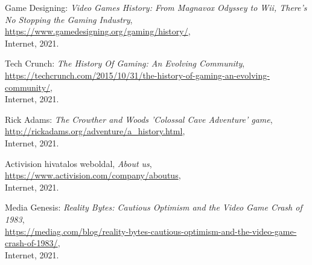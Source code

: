 \begin{thebibliography}{x}
	Game Designing: \emph{Video Games History: From Magnavox Odyssey to Wii, There’s No Stopping the Gaming Industry}, \\
	\url{https://www.gamedesigning.org/gaming/history/}, \\
	Internet, 2021.
	
	Tech Crunch: \emph{The History Of Gaming: An Evolving Community}, \\
	\url{https://techcrunch.com/2015/10/31/the-history-of-gaming-an-evolving-community/}, \\
	Internet, 2021.
	
	Rick Adams: \emph{The Crowther and Woods 'Colossal Cave Adventure' game}, \\
	\url{http://rickadams.org/adventure/a_history.html}, \\
	Internet, 2021.
	
	
	Activision hivatalos weboldal, \emph{About us}, \\
	\url{https://www.activision.com/company/aboutus}, \\
	Internet, 2021.
	
	Media Genesis: \emph{Reality Bytes: Cautious Optimism and the Video Game Crash of 1983}, \\
	\url{https://mediag.com/blog/reality-bytes-cautious-optimism-and-the-video-game-crash-of-1983/}, \\
	Internet, 2021.
	
		

\end{thebibliography}
